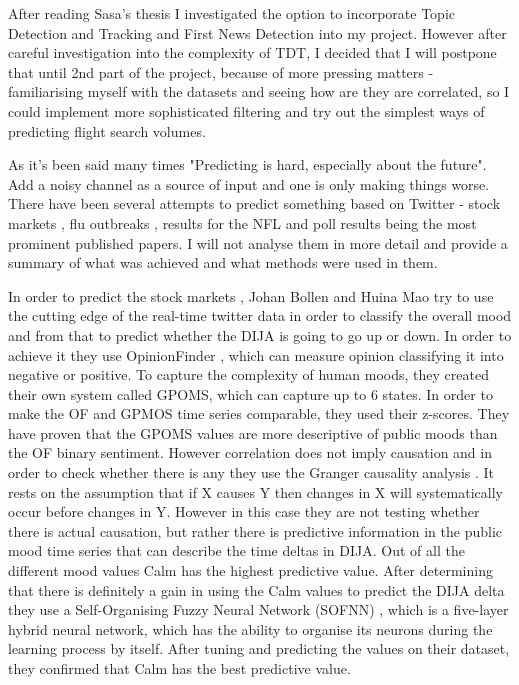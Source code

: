 \documentclass[minf,twoside,singlespacing,parskip,frontabs]{infthesis}
\begin{document}
After reading Sasa's thesis \cite{Petrovic2012} I investigated the option to incorporate Topic Detection and Tracking and First News Detection into my project.  However after careful investigation into the complexity of TDT, I decided that I will postpone that until 2nd part of the project, because of more pressing matters - familiarising myself with the datasets and seeing how are they are correlated, so I could implement more sophisticated filtering and try out the simplest ways of predicting flight search volumes.


As it's been said many times "Predicting is hard, especially about the future".  Add a noisy channel as a source of input and one is only making things worse. There have been several attempts to predict something based on Twitter - stock markets \cite{twitstock},  flu outbreaks \cite{twitflu}, results for the NFL \cite{twitnfl} and poll results \cite{twitpoll} being the most prominent published papers. I will not analyse them in more detail and provide a summary of what was achieved and what methods were used in them.


In order to predict the stock markets \cite{twitstock}, Johan Bollen and Huina Mao try to use the cutting edge of the real-time twitter data in order to classify the overall mood and from that to predict whether the DIJA \cite{dija} is going to go up or down. In order to achieve it they use OpinionFinder \cite{opfind}, which can measure opinion classifying it into negative or positive. To capture the complexity of human moods, they created their own system called GPOMS, which can capture up to 6 states. 
In order to make the OF and GPMOS time series comparable, they used their z-scores. They have proven that the GPOMS values are more descriptive of public moods than the OF binary sentiment. However correlation does not imply causation and in order to check whether there is any they use the Granger causality analysis \cite{granger}. It rests on the assumption that if X causes Y then changes in X will systematically occur before changes in Y. However in this case they are not testing whether there is actual causation, but rather there is predictive information in the public mood time series that can describe the time deltas in DIJA. Out of all the different mood values Calm has the highest predictive value. After determining that there is definitely a gain in using the Calm values to predict the DIJA delta they use a Self-Organising Fuzzy Neural Network (SOFNN) \cite{sofnn}, which is a five-layer hybrid neural network, which has the ability to organise its neurons during the learning process by itself. After tuning and predicting the values on their dataset, they confirmed that Calm has the best predictive value. 
\end{document}
